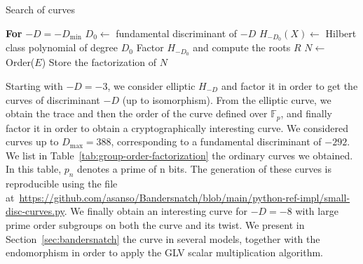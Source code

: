 \documentclass[smallextended]{svjour3}
\begin{document}
\begin{algorithm}
\caption{Search of curves}
\label{alg:search}
\begin{algorithmic}[1]
    \State \textbf{For} $-D = -D_{\min}$
        \State $D_0 \gets$ fundamental discriminant of $-D$
        \State $H_{-D_0}(X) \gets$ Hilbert class polynomial of degree $D_0$
        \State Factor $H_{-D_0}$ and compute the roots $R$
                    \State $N \gets$ Order($E$)
                    \State Store the factorization of $N$
                \EndIf
            \EndFor
        \EndFor 
    \EndFor
\end{algorithmic}
\end{algorithm}

Starting with $-D = -3$, we consider elliptic  $H_{-D}$ and factor it in order to get the curves of discriminant $-D$ (up to isomorphism). From the elliptic curve, we obtain the trace and then the order of the curve defined over $\mathbb F_p$, and finally factor it in order to obtain a cryptographically interesting curve.
We considered curves up to $D_{\max} = 388$, corresponding to a fundamental discriminant of $-292$.
We list in Table~\ref{tab:group-order-factorization} the ordinary curves we obtained. In this table,
$p_n$ denotes a prime of n bits. The generation of these curves is reproducible
using the file at~\url{https://github.com/asanso/Bandersnatch/blob/main/python-ref-impl/small-disc-curves.py}.
We finally obtain an interesting curve for $-D = -8$ with large prime order subgroups on both the curve and its twist. We present in Section~\ref{sec:bandersnatch} the curve in several models, together with the endomorphism in order to apply the GLV scalar multiplication algorithm.
\end{document}
